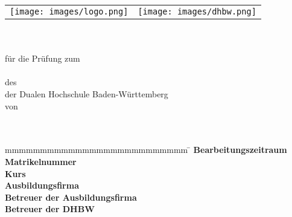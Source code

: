 \begin{titlepage}

\begin{longtable}{p{} p{}}
  {\texttt{[image: images/logo.png]}} & 
  {\texttt{[image: images/dhbw.png]}}
\end{longtable}

\begin{center}
  \vspace*{10mm}    {\LARGE\bf \titel }\\
  \vspace*{10mm}    {\large\bf \arbeit}\\
  \vspace*{10mm}    für die Prüfung zum\\
  \vspace*{10mm}    {\bf \abschluss}\\
  \vspace*{10mm}    des \studiengang\\
  \vspace*{1mm}     der Dualen Hochschule Baden-Württemberg \dhbw\\
  \vspace*{10mm}    von\\
  \vspace*{1mm}     {\large\bf \autor}\\
  \vspace*{10mm}    \datumVonBis\\
\end{center}

\vfill

\begin{tabbing}
  mmmmmmmmmmmmmmmmmmmmmmmmmm                \= \kill
  \textbf{Bearbeitungszeitraum}             \>  \zeitraum\\
  \textbf{Matrikelnummer}                   \>  \martrikelnr\\
  \textbf{Kurs}                             \>  \kurs\\
  \textbf{Ausbildungsfirma}                 \>  \firma\\
  \textbf{Betreuer der Ausbildungsfirma}    \>  \betreuer\\
  \textbf{Betreuer der DHBW}                \>  \betreuerDHBW
\end{tabbing}
\end{titlepage}

